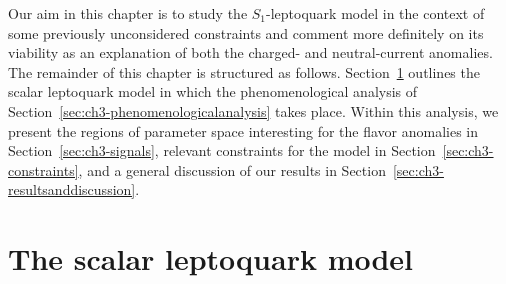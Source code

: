 Our aim in this chapter is to study the $S_{1}$-leptoquark model in the context
of some previously unconsidered constraints and comment more definitely on its
viability as an explanation of both the charged- and neutral-current anomalies.
The remainder of this chapter is structured as follows.
Section~\ref{sec:ch3-thescalarleptoquarkmodel} outlines the scalar leptoquark model
in which the phenomenological analysis of
Section~\ref{sec:ch3-phenomenologicalanalysis} takes place. Within this analysis, we
present the regions of parameter space interesting for the flavor anomalies in
Section~\ref{sec:ch3-signals}, relevant constraints for the model in
Section~\ref{sec:ch3-constraints}, and a general discussion of our results in
Section~\ref{sec:ch3-resultsanddiscussion}.

\section{The scalar leptoquark model}
\label{sec:ch3-thescalarleptoquarkmodel}

